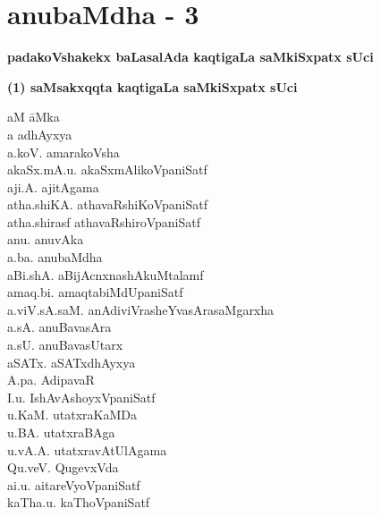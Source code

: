 \chapter*{anubaMdha - 3}

\lhead[]{}
\rhead[]{}

\begin{center}
{\huge\bf padakoVshakekx baLasalAda kaqtigaLa saMkiSxpatx sUci}
\end{center}

\medskip

\begin{center}
{\large\bf (1) saMsakxqqta kaqtigaLa saMkiSxpatx sUci}
\end{center}

{
\setlength{\columnseprule}{1pt} 
\begin{multicols}{2}
\begin{tabbing}
aM\hspace{3cm} \= aMka\\[2pt]
a \> adhAyxya\\[2pt]
a.koV. \> amarakoVsha\\[2pt]
akaSx.mA.u. \> akaSxmAlikoVpaniSatf\\[2pt]
aji.A. \> ajitAgama\\[2pt]
atha.shiKA. \> athavaRshiKoVpaniSatf\\[2pt]
atha.shirasf \> athavaRshiroVpaniSatf\\[2pt]
anu. \> anuvAka\\[2pt]
a.ba. \> anubaMdha\\[2pt]
aBi.shA. \> aBijAcnxnashAkuMtalamf\\[2pt]
amaq.bi. \> amaqtabiMdUpaniSatf\\[2pt]
a.viV.sA.saM. \> anAdiviVrasheYvasArasaMgarxha\\[2pt]
a.sA. \> anuBavasAra\\[2pt]
a.sU. \> anuBavasUtarx\\[2pt]
aSATx. \> aSATxdhAyxya\\[2pt]
A.pa. \> AdipavaR\\[2pt]
I.u. \> IshAvAshoyxVpaniSatf\\[2pt]
u.KaM. \> utatxraKaMDa\\[2pt]
u.BA. \> utatxraBAga\\[2pt]
u.vA.A. \> utatxravAtUlAgama\\[2pt]
Qu.veV. \> QugevxVda\\[2pt]
ai.u. \> aitareVyoVpaniSatf\\[2pt]
kaTha.u. \> kaThoVpaniSatf\\[2pt]

\end{tabbing}
\end{multicols}}
